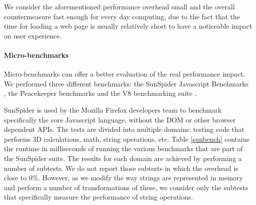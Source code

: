 We consider the aforementioned performance overhead small and the overall countermeasure fast enough for every day computing, due to the fact that the time for loading a web page is usually relatively short to have a noticeable impact on user experience.

\paragraph{Micro-benchmarks}
Micro-benchmarks can offer a better evaluation of the real performance impact. We performed three different benchmarks: the SunSpider Javascript Benchmarks \cite{sunspider}, the Peacekeeper benchmarks \cite{peacekeeper} and the V8 benchmarking suite \cite{V8}.

SunSpider is used by the Mozilla Firefox developers team to benchmark specifically the core Javascript language, without the DOM or other browser dependent APIs. The tests are divided into multiple domains: testing code that performs 3D calculations, math, string operations, etc.
Table \ref{sunbench} contains the runtime in milliseconds of running the various benchmarks that are part of the SunSpider suite. 
The results for each domain are achieved by performing a number of subtests.  We do not report those subtests in which the overhead is close to 0\%. However, as we modify the way strings are represented in memory and perform a number of transformations of these, we consider only the subtests that specifically measure the performance of string operations. 

